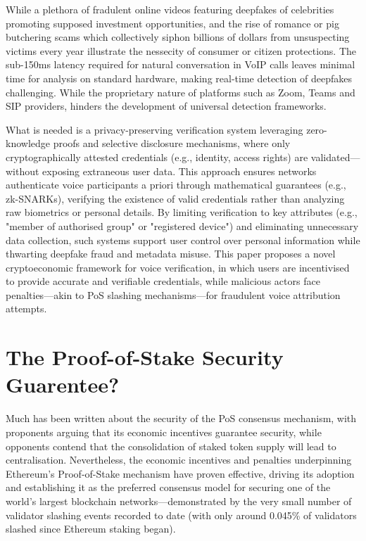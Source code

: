 \documentclass[11pt,a4paper]{article}
\begin{document}
While a plethora of fradulent online videos featuring deepfakes of celebrities promoting supposed investment opportunities, and the rise of romance or \textquotesingle pig butchering\textquotesingle{} scams which collectively siphon billions of dollars from unsuspecting victims every year illustrate the nessecity of consumer or citizen protections.
The sub-150ms latency required for natural conversation in VoIP calls leaves minimal time for analysis on standard hardware, making real-time detection of deepfakes challenging. While the proprietary nature of platforms such as Zoom, Teams and SIP providers, hinders the development of universal detection frameworks.

What is needed is a privacy-preserving verification system leveraging zero-knowledge proofs and selective disclosure mechanisms, where only cryptographically attested credentials (e.g., identity, access rights) are validated—without exposing extraneous user data.
This approach ensures networks authenticate voice participants a priori through mathematical guarantees (e.g., zk-SNARKs), verifying the existence of valid credentials rather than analyzing raw biometrics or personal details.
By limiting verification to key attributes (e.g., "member of authorised group" or "registered device") and eliminating unnecessary data collection, such systems support user control over personal information while thwarting deepfake fraud and metadata misuse.
This paper proposes a novel cryptoeconomic framework for voice verification, in which users are incentivised to provide accurate and verifiable credentials, while malicious actors face penalties—akin to PoS slashing mechanisms—for fraudulent voice attribution attempts.

\section{The Proof-of-Stake Security Guarentee?}
\label{sec:background}
Much has been written about the security of the PoS consensus mechanism, with proponents arguing that its economic incentives guarantee security, while opponents contend that the consolidation of staked token supply will lead to centralisation.
Nevertheless, the economic incentives and penalties underpinning Ethereum's Proof-of-Stake mechanism have proven effective, driving its adoption and establishing it as the preferred consensus model for securing one of the world's largest blockchain networks—demonstrated by the very small number of validator slashing events recorded to date (with only around 0.045\% of validators slashed since Ethereum staking began).
\end{document}
